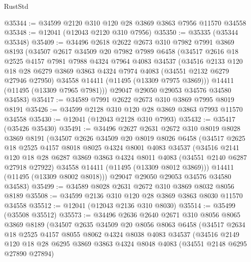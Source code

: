 \begin{lexlean}{RustStd}
\begin{coremodule}
@35344 := @34599 @2120 @310 @120 @28 @3869 @3863 @7956 @11570 @34558
@35348 := @12041 (@12043 @2120 @310 @7956)
@35350 := @35335 (@35344 @35348)
@35409 := @34496
    @2618
    @2622
    @2673
    @310
    @7982
    @7991
    @3869
    @8193
    (@34507
      @2617
      @34509
      @20
      @7982
      @7989
      @6458
      (@34517
        @2616
        @18
        @2525
        @4157
        @7981
        @7988
        @4324
        @7964
        @4083
        @34537
        (@34516
          @2133
          @120
          @18
          @28
          @6279
          @3869
          @3863
          @4324
          @7974
          @4083
          (@34551 @2132 @6279 @27946 @27950)
          @34558
          @14411
          (@11495 (@13309 @7975 @3869)))
        @14411
        (@11495 (@13309 @7965 @7981)))
      @29047
      @29050
      @29053
      @34576
      @34580
      @34583)
@35417 := @34589 @7991 @2622 @2673 @310 @3869 @7995 @8019 @8191
@35426 := @34599 @2128 @310 @120 @28 @3869 @3863 @7993 @11570 @34558
@35430 := @12041 (@12043 @2128 @310 @7993)
@35432 := @35417 (@35426 @35430)
@35491 := @34496
    @2627
    @2631
    @2672
    @310
    @8019
    @8028
    @3869
    @8191
    (@34507
      @2626
      @34509
      @20
      @8019
      @8026
      @6458
      (@34517
        @2625
        @18
        @2525
        @4157
        @8018
        @8025
        @4324
        @8001
        @4083
        @34537
        (@34516
          @2141
          @120
          @18
          @28
          @6287
          @3869
          @3863
          @4324
          @8011
          @4083
          (@34551 @2140 @6287 @27918 @27922)
          @34558
          @14411
          (@11495 (@13309 @8012 @3869)))
        @14411
        (@11495 (@13309 @8002 @8018)))
      @29047
      @29050
      @29053
      @34576
      @34580
      @34583)
@35499 := @34589 @8028 @2631 @2672 @310 @3869 @8032 @8056 @8189
@35508 := @34599 @2136 @310 @120 @28 @3869 @3863 @8030 @11570 @34558
@35512 := @12041 (@12043 @2136 @310 @8030)
@35514 := @35499 (@35508 @35512)
@35573 := @34496
    @2636
    @2640
    @2671
    @310
    @8056
    @8065
    @3869
    @8189
    (@34507
      @2635
      @34509
      @20
      @8056
      @8063
      @6458
      (@34517
        @2634
        @18
        @2525
        @4157
        @8055
        @8062
        @4324
        @8038
        @4083
        @34537
        (@34516
          @2149
          @120
          @18
          @28
          @6295
          @3869
          @3863
          @4324
          @8048
          @4083
          (@34551 @2148 @6295 @27890 @27894)

\end{coremodule}
\end{lexlean}
